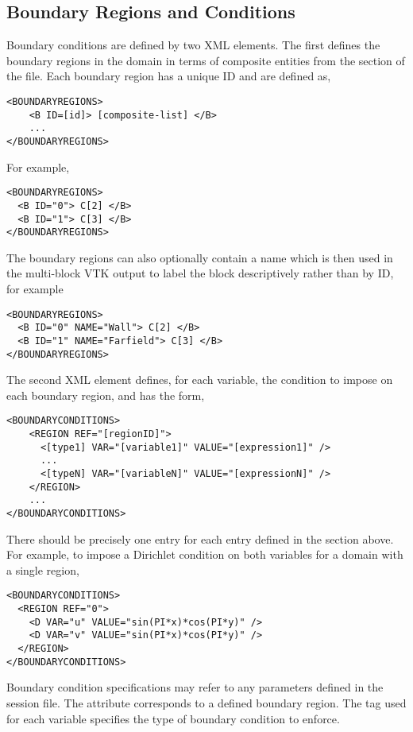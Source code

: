 \subsection{Boundary Regions and Conditions}

Boundary conditions are defined by two XML elements. The first defines the
boundary regions in the domain in terms of composite entities from the
 section of the file. Each boundary region has a unique ID and
are defined as, 
\begin{lstlisting}[style=XMLStyle]
<BOUNDARYREGIONS>
    <B ID=[id]> [composite-list] </B>
    ...
</BOUNDARYREGIONS>
\end{lstlisting}
For example,
\begin{lstlisting}[style=XMLStyle]
<BOUNDARYREGIONS>
  <B ID="0"> C[2] </B>
  <B ID="1"> C[3] </B>
</BOUNDARYREGIONS>
\end{lstlisting}

The boundary regions can also optionally contain a name which is then used in the
multi-block VTK output to label the block descriptively rather than by ID, for
example
\begin{lstlisting}[style=XMLStyle]
<BOUNDARYREGIONS>
  <B ID="0" NAME="Wall"> C[2] </B>
  <B ID="1" NAME="Farfield"> C[3] </B>
</BOUNDARYREGIONS>
\end{lstlisting}

The second XML element defines, for each variable, the condition to impose on
each boundary region, and has the form,
\begin{lstlisting}[style=XMLStyle]
<BOUNDARYCONDITIONS>
    <REGION REF="[regionID]">
      <[type1] VAR="[variable1]" VALUE="[expression1]" />
      ...
      <[typeN] VAR="[variableN]" VALUE="[expressionN]" />
    </REGION>
    ...
</BOUNDARYCONDITIONS>
\end{lstlisting}
There should be precisely one  entry for each  entry
defined in the  section above. For example, to impose a
Dirichlet condition on both variables for a domain with a single region, 
\begin{lstlisting}[style=XMLStyle] 
<BOUNDARYCONDITIONS>
  <REGION REF="0">
    <D VAR="u" VALUE="sin(PI*x)*cos(PI*y)" /> 
    <D VAR="v" VALUE="sin(PI*x)*cos(PI*y)" />
  </REGION>
</BOUNDARYCONDITIONS>
\end{lstlisting}
Boundary condition specifications may refer to any parameters defined in the
session file. The  attribute corresponds to a defined boundary
region. The tag used for each variable specifies the type of boundary condition
to enforce.

